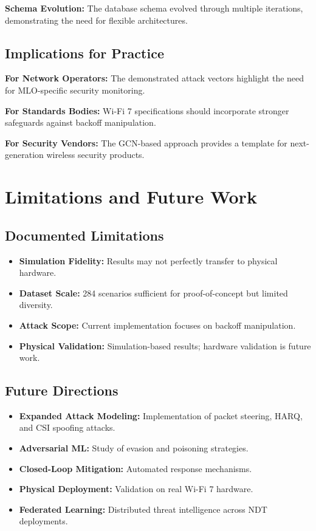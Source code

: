 \documentclass[12pt,a4paper]{article}
\begin{document}
\textbf{Schema Evolution:} The database schema evolved through multiple iterations, demonstrating the need for flexible architectures.

\subsection{Implications for Practice}

\textbf{For Network Operators:} The demonstrated attack vectors highlight the need for MLO-specific security monitoring.

\textbf{For Standards Bodies:} Wi-Fi 7 specifications should incorporate stronger safeguards against backoff manipulation.

\textbf{For Security Vendors:} The GCN-based approach provides a template for next-generation wireless security products.

\section{Limitations and Future Work}

\subsection{Documented Limitations}

\begin{itemize}
    \item \textbf{Simulation Fidelity:} Results may not perfectly transfer to physical hardware.
    \item \textbf{Dataset Scale:} 284 scenarios sufficient for proof-of-concept but limited diversity.
    \item \textbf{Attack Scope:} Current implementation focuses on backoff manipulation.
    \item \textbf{Physical Validation:} Simulation-based results; hardware validation is future work.
\end{itemize}

\subsection{Future Directions}

\begin{itemize}
    \item \textbf{Expanded Attack Modeling:} Implementation of packet steering, HARQ, and CSI spoofing attacks.
    \item \textbf{Adversarial ML:} Study of evasion and poisoning strategies.
    \item \textbf{Closed-Loop Mitigation:} Automated response mechanisms.
    \item \textbf{Physical Deployment:} Validation on real Wi-Fi 7 hardware.
    \item \textbf{Federated Learning:} Distributed threat intelligence across NDT deployments.
\end{itemize}
\end{document}
